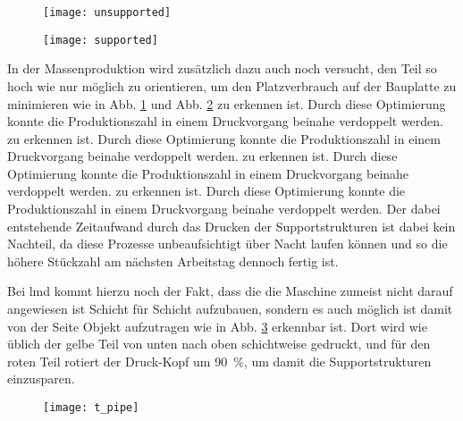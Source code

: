 \documentclass[../main.tex]{subfiles}
\begin{document}
\begin{figure}[H]
	\centering
	\texttt{[image: unsupported]}
	\label{img:unsupp_1}
\end{figure}
\begin{figure}[H]
	\centering
	\texttt{[image: supported]}
	\label{img:supp_1}
\end{figure}
In der Massenproduktion wird zusätzlich dazu auch noch versucht, den Teil so hoch wie nur möglich zu orientieren, um den Platzverbrauch auf der Bauplatte zu minimieren wie in Abb. \ref{img:unsupp_1} und Abb. \ref{img:supp_1} zu erkennen ist. Durch diese Optimierung konnte die Produktionszahl in einem Druckvorgang beinahe verdoppelt werden.  zu erkennen ist. Durch diese Optimierung konnte die Produktionszahl in einem Druckvorgang beinahe verdoppelt werden.  zu erkennen ist. Durch diese Optimierung konnte die Produktionszahl in einem Druckvorgang beinahe verdoppelt werden.  zu erkennen ist. Durch diese Optimierung konnte die Produktionszahl in einem Druckvorgang beinahe verdoppelt werden. Der dabei entstehende Zeitaufwand durch das Drucken der Supportstrukturen ist dabei kein Nachteil, da diese Prozesse unbeaufsichtigt über Nacht laufen können und so die höhere Stückzahl am nächsten Arbeitstag dennoch fertig ist.

Bei \acrfull{lmd} kommt hierzu noch der Fakt, dass die die Maschine zumeist nicht darauf angewiesen ist Schicht für Schicht aufzubauen, sondern es auch möglich ist damit von der Seite Objekt aufzutragen wie in Abb. \ref{img:t_pipe} erkennbar ist. Dort wird wie üblich der gelbe Teil von unten nach oben schichtweise gedruckt, und für den roten Teil rotiert der Druck-Kopf um \qty{90}{\percent}, um damit die Supportstrukturen einzusparen. 
\begin{figure}[H]
	\centering
	\texttt{[image: t\_pipe]}
	\label{img:t_pipe}
\end{figure}
\end{document}
